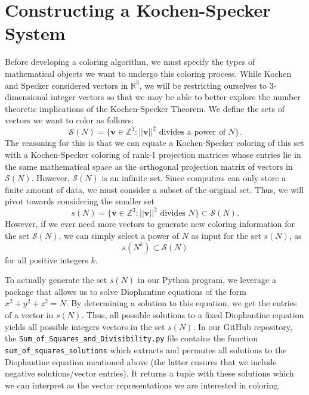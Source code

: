 \documentclass[11pt]{article}
\begin{document}
\section{Constructing a Kochen-Specker System}
\hspace{\parindent}Before developing a coloring algorithm, we must specify the types of mathematical objects we want to undergo this coloring process. While Kochen and Specker considered vectors in $\mathbb{R}^{3}$, we will be restricting ourselves to 3-dimensional integer vectors so that we may be able to better explore the number theoretic implications of the Kochen-Specker Theorem. We define the sets of vectors we want to color as follows:
\[\mathcal{S}(N) = \{\mathbf{v} \in \mathbb{Z}^{3}: ||\mathbf{v}||^{2} \text{ divides a power of } N\}.\]
The reasoning for this is that we can equate a Kochen-Specker coloring of this set with a Kochen-Specker coloring of rank-1 projection matrices whose entries lie in the same mathematical space as the orthogonal projection matrix of vectors in $\mathcal{S}(N)$. However, $\mathcal{S}(N)$ is an infinite set. Since computers can only store a finite amount of data, we must consider a subset of the original set. Thus, we will pivot towards considering the smaller set
\[s(N) = \{\mathbf{v} \in \mathbb{Z}^{3}: ||\mathbf{v}||^{2} \text{ divides } N\} \subset \mathcal{S}(N).\]
However, if we ever need more vectors to generate new coloring information for the set $\mathcal{S}(N)$, we can simply select a power of $N$ as input for the set $s(N)$, as
\[s(N^{k}) \subset \mathcal{S}(N)\]
for all positive integers $k$.

To actually generate the set $s(N)$ in our Python program, we leverage a package that allows us to solve Diophantine equations of the form $x^{2} + y^{2} + z^{2} = N$. By determining a solution to this equation, we get the entries of a vector in $s(N)$. Thus, all possible solutions to a fixed Diophantine equation yields all possible integers vectors in the set $s(N)$. In our GitHub repository, the \texttt{Sum\_of\_Squares\_and\_Divisibility.py} file contains the function \texttt{sum\_of\_squares\_solutions} which extracts and permutes all solutions to the Diophantine equation mentioned above (the latter ensures that we include negative solutions/vector entries). It returns a tuple with these solutions which we can interpret as the vector representations we are interested in coloring.
\end{document}

